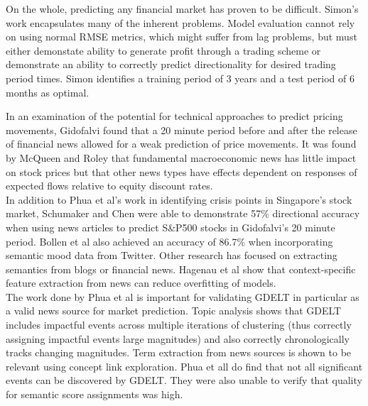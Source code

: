 On the whole, predicting any financial market has proven to be difficult. Simon's work encapsulates many of the inherent problems. Model evaluation cannot rely on using normal RMSE metrics, which might suffer from lag problems, but must either demonstate ability to generate profit through a trading scheme or demonstrate an ability to correctly predict directionality for desired trading period times. Simon identifies a training period of 3 years and a test period of 6 months as optimal.\cite{forex_neuralnets}

\noindent In an examination of the potential for technical approaches to predict pricing movements, Gidofalvi found that a 20 minute period before and after the release of financial news allowed for a weak prediction of price movements.\cite{gidofalvi2001using} It was found by McQueen and Roley that fundamental macroeconomic news has little impact on stock prices but that other news types have effects dependent on responses of expected flows relative to equity discount rates.\cite{mcqueen1993stock}\\

\noindent In addition to Phua et al's work in identifying crisis points in Singapore's stock market, Schumaker and Chen were able to demonstrate 57\% directional accuracy when using news articles to predict S\&P500 stocks in Gidofalvi's 20 minute period.\cite{schumaker2009technical} Bollen et al also achieved an accuracy of 86.7\% when incorporating semantic mood data from Twitter.\cite{bollen2011twitter} Other research has focused on extracting semantics from blogs or financial news. Hagenau et al show that context-specific feature extraction from news can reduce overfitting of models.\cite{hagenau2012automated}\\

\noindent The work done by Phua et al is important for validating GDELT in particular as a valid news source for market prediction. Topic analysis shows that GDELT includes impactful events across multiple iterations of clustering (thus correctly assigning impactful events large magnitudes) and also correctly chronologically tracks changing magnitudes. Term extraction from news sources is shown to be relevant using concept link exploration. Phua et all do find that not all significant events can be discovered by GDELT. They were also unable to verify that quality for semantic score assignments was high.